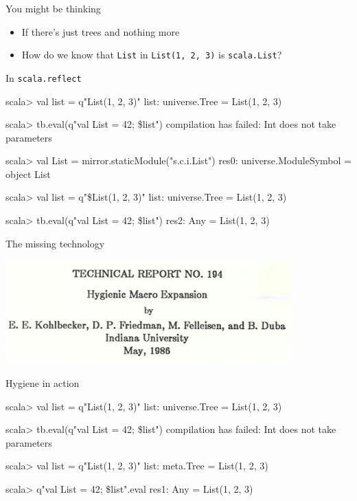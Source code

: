 \documentclass[svgnames,dvipsnames,hyperref={bookmarks=false},usepdftitle=false]{beamer}
\begin{document}
\begin{frame}{You might be thinking}
\begin{itemize}
\item If there's just trees and nothing more
\item How do we know that \texttt{List} in \texttt{List(1, 2, 3)} is \texttt{scala.List}?
\end{itemize}
\end{frame}

\begin{frame}[fragile]{In \texttt{scala.reflect}}
\begin{bad}
scala> val list = q"List(1, 2, 3)"
list: universe.Tree = List(1, 2, 3)

scala> tb.eval(q"val List = 42; \$list")
compilation has failed: Int does not take parameters
\end{bad}
\pause
\begin{good}
scala> val List = mirror.staticModule("s.c.i.List")
res0: universe.ModuleSymbol = object List

scala> val list = q"\$List(1, 2, 3)"
list: universe.Tree = List(1, 2, 3)

scala> tb.eval(q"val List = 42; \$list")
res2: Any = List(1, 2, 3)
\end{good}
\end{frame}

\begin{frame}[c, fragile]{The missing technology}
\vskip40pt
\begin{center}
\includegraphics[height=4cm]{hygiene.png}
\end{center}
\end{frame}

\begin{frame}[fragile]{Hygiene in action}
\begin{beforeblock}
scala> val list = q"List(1, 2, 3)"
list: universe.Tree = List(1, 2, 3)

scala> tb.eval(q"val List = 42; \$list")
compilation has failed: Int does not take parameters
\end{beforeblock}
\begin{afterblock}
scala> val list = q"List(1, 2, 3)"
list: meta.Tree = List(1, 2, 3)

scala> q"val List = 42; \$list".eval
res1: Any = List(1, 2, 3)
\end{afterblock}
\end{frame}
\end{document}
